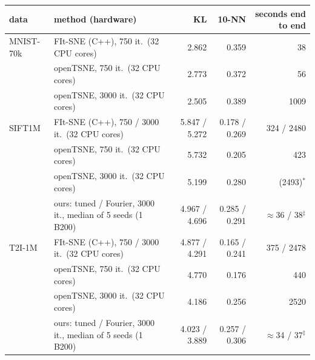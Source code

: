 \begin{tabular}{llrrr}\toprule
data & method (hardware) & KL & 10-NN & seconds end to end\\\midrule
MNIST-70k & FIt-SNE (C++), 750 it.\ (32 CPU cores) & 2.862 & 0.359 & 38\\
 & openTSNE, 750 it.\ (32 CPU cores) & 2.773 & 0.372 & 56\\
 & openTSNE, 3000 it.\ (32 CPU cores) & 2.505 & 0.389 & 1009\\
SIFT1M & FIt-SNE (C++), 750 / 3000 it.\ (32 CPU cores) & 5.847 / 5.272 & 0.178 / 0.269 & 324 / 2480\\
 & openTSNE, 750 it.\ (32 CPU cores) & 5.732 & 0.205 & 423\\
 & openTSNE, 3000 it.\ (32 CPU cores) & 5.199 & 0.280 & (2493)$^\ast$\\
 & ours: tuned / Fourier, 3000 it., median of 5 seeds (1 B200) & 4.967 / 4.696 & 0.285 / 0.291 & $\approx$36 / 38$^\ddagger$\\
T2I-1M & FIt-SNE (C++), 750 / 3000 it.\ (32 CPU cores) & 4.877 / 4.291 & 0.165 / 0.241 & 375 / 2478\\
 & openTSNE, 750 it.\ (32 CPU cores) & 4.770 & 0.176 & 440\\
 & openTSNE, 3000 it.\ (32 CPU cores) & 4.186 & 0.256 & 2520\\
 & ours: tuned / Fourier, 3000 it., median of 5 seeds (1 B200) & 4.023 / 3.889 & 0.257 / 0.306 & $\approx$34 / 37$^\ddagger$\\
\bottomrule\end{tabular}
